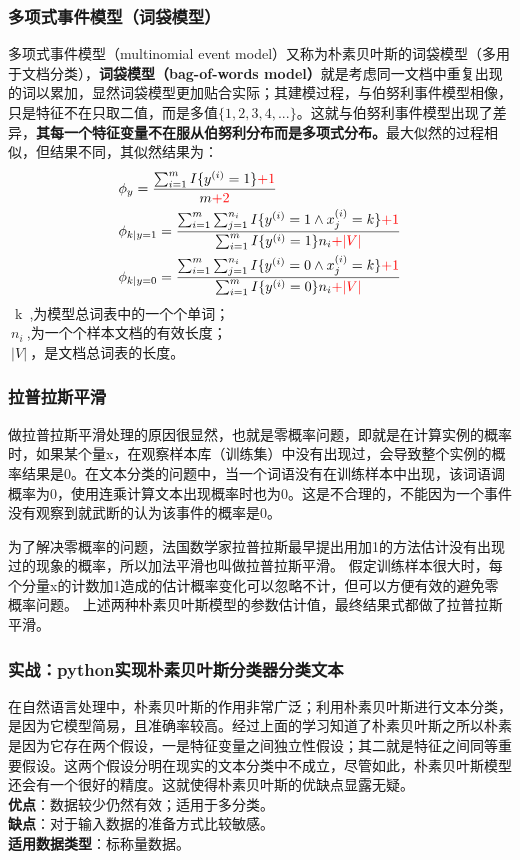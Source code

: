 \subsubsection{多项式事件模型（词袋模型）} %
多项式事件模型（multinomial event model）又称为朴素贝叶斯的词袋模型（多用于文档分类），\textbf{词袋模型（bag-of-words model）}就是考虑同一文档中重复出现的词以累加，显然词袋模型更加贴合实际；其建模过程，与伯努利事件模型相像，只是特征不在只取二值，而是多值$\{1,2,3,4,...\}$。这就与伯努利事件模型出现了差异，\textbf{其每一个特征变量不在服从伯努利分布而是多项式分布。}最大似然的过程相似，但结果不同，其似然结果为：
\begin{equation}\nonumber
\begin{split}
  &\phi_y = \frac{\sum_{i=1}^{m}I\{y^{(i)}=1\}{\color{red}{+1}}}{m{\color{red}{+2}}}\\
  &\phi_{k|y=1}=\frac{\sum_{i=1}^{m}\sum_{j=1}^{n_i}I\{y^{(i)}=1\wedge x_j^{(i)}=k\}{\color{red}{+1}}}  {\sum_{i=1}^{m}I\{y^{(i)}=1\}n_i{\color{red}{+|V|}}}\\
  &\phi_{k|y=0}=\frac{\sum_{i=1}^{m}\sum_{j=1}^{n_i}I\{y^{(i)}=0\wedge x_j^{(i)}=k\}{\color{red}{+1}}}{\sum_{i=1}^{m}I\{y^{(i)}=0\}n_i{\color{red}{+|V|}}}\\
\end{split}
\end{equation}
~k~,为模型总词表中的一个个单词；\\$~n_i~$,为一个个样本文档的有效长度；\\$~|V|~$，是文档总词表的长度。

\subsubsection{拉普拉斯平滑}
做拉普拉斯平滑处理的原因很显然，也就是零概率问题，即就是在计算实例的概率时，如果某个量x，在观察样本库（训练集）中没有出现过，会导致整个实例的概率结果是0。在文本分类的问题中，当一个词语没有在训练样本中出现，该词语调概率为0，使用连乘计算文本出现概率时也为0。这是不合理的，不能因为一个事件没有观察到就武断的认为该事件的概率是0。

为了解决零概率的问题，法国数学家拉普拉斯最早提出用加1的方法估计没有出现过的现象的概率，所以加法平滑也叫做拉普拉斯平滑。
假定训练样本很大时，每个分量x的计数加1造成的估计概率变化可以忽略不计，但可以方便有效的避免零概率问题。
上述两种朴素贝叶斯模型的参数估计值，最终结果式都做了拉普拉斯平滑。
\subsubsection{实战：python实现朴素贝叶斯分类器分类文本}
在自然语言处理中，朴素贝叶斯的作用非常广泛；利用朴素贝叶斯进行文本分类，是因为它模型简易，且准确率较高。经过上面的学习知道了朴素贝叶斯之所以朴素是因为它存在两个假设，一是特征变量之间独立性假设；其二就是特征之间同等重要假设。这两个假设分明在现实的文本分类中不成立，尽管如此，朴素贝叶斯模型还会有一个很好的精度。这就使得朴素贝叶斯的优缺点显露无疑。\\
\textbf{优点}：数据较少仍然有效；适用于多分类。\\
\textbf{缺点}：{\color{red}对于输入数据的准备方式比较敏感。}\\
\textbf{适用数据类型}：标称量数据。

